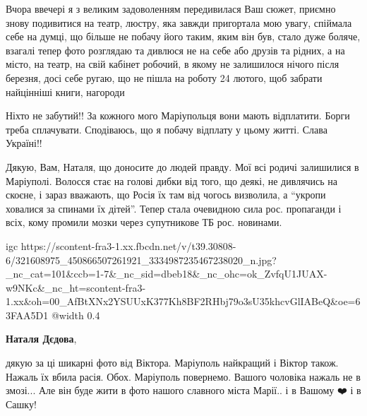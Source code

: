 
Вчора ввечері я з великим задоволенням передивилася Ваш сюжет, приємно знову
подивитися на театр, люстру, яка завжди пригортала мою увагу, спіймала себе на
думці, що більше не побачу його таким, яким він був, стало дуже боляче, взагалі
тепер фото розглядаю та дивлюся не на себе або друзів та рідних, а на місто, на
театр, на свій кабінет робочий, в якому не залишилося нічого після березня,
досі себе ругаю, що не пішла на роботу 24 лютого, щоб забрати найцінніші книги,
нагороди


Ніхто не забутий!! За кожного мого Маріупольця вони мають відплатити. Борги
треба сплачувати. Сподіваюсь, що я побачу відплату у цьому житті. Слава
Україні!!


Дякую, Вам, Наталя, що доносите до людей правду. Мої всі родичі залишилися в
Маріуполі. Волосся стає на голові дибки від того, що деякі, не дивлячись на
скоєне, і зараз вважають, що Росія їх там від чогось визволила, а \enquote{укропи
ховалися за спинами їх дітей}. Тепер стала очевидною сила рос. пропаганди і
всіх, кому промили мозки через супутникове ТБ рос. новинами.


\ifcmt
  igc https://scontent-fra3-1.xx.fbcdn.net/v/t39.30808-6/321608975_450866507261921_3334987235467238020_n.jpg?_nc_cat=101&ccb=1-7&_nc_sid=dbeb18&_nc_ohc=ok_ZvfqU1JUAX-w9NKc&_nc_ht=scontent-fra3-1.xx&oh=00_AfBtXNx2YSUUxK377Kh8BF2RHbj79o3sU35khcvGlIABeQ&oe=63FAA5D1
	@width 0.4
\fi

\textbf{Наталя Дєдова}, 

дякую за ці шикарні фото від Віктора. Маріуполь найкращий і Віктор також.
Нажаль їх вбила расія. Обох. Маріуполь повернемо. Вашого чоловіка нажаль не в
змозі... Але він буде жити в фото нашого славного міста Марії.. і в Вашому ❤️ і
в Сашку!

